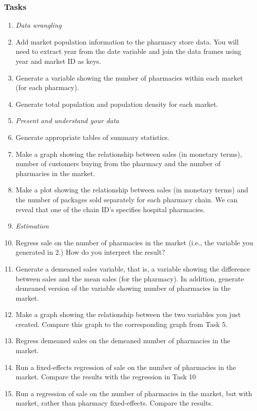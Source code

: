 \documentclass[12pt,a4paper]{article}
\begin{document}
\subsubsection*{Tasks}
\begin{enumerate}
 \item[] \emph{Data wrangling}
 \item Add market population information to the pharmacy store data. You will need to extract year from the date variable and join the data frames using year and market ID as keys.
 \item Generate a variable showing the number of pharmacies within each market (for each pharmacy).
 \item Generate total population and population density for each market.
 \item[] \emph{Present and understand your data}
 \item Generate appropriate tables of summary statistics.
 \item Make a graph showing the relationship between sales (in monetary terms), number of customers buying from the pharmacy and the number of pharmacies in the market.
 \item Make a plot showing the relationship between sales (in monetary terms) and the number of packages sold separately for each pharmacy chain. We can reveal that one of the chain ID's specifies hospital pharmacies.
 \item[] \emph{Estimation}
 \item Regress sale on the number of pharmacies in the market (i.e., the variable you generated in 2.) How do you interpret 
 the result?
 \item Generate a demeaned sales variable, that is, a variable showing the difference between sales and the mean sales (for the pharmacy). In addition, generate demeaned version of the variable showing number of pharmacies in the market.
 \item Make a graph showing the relationship between the two variables you just created. Compare this graph to the corresponding graph from Task 5.
 \item Regress demeaned sales on the demeaned number of pharmacies in the market.
 \item Run a fixed-effects regression of sale on the number of pharmacies in the market. Compare the results with the regression in Task 10
 \item Run a regression of sale on the number of pharmacies in the market, but with market, rather than pharmacy fixed-effects. Compare the results.

\end{enumerate}
\end{document}
